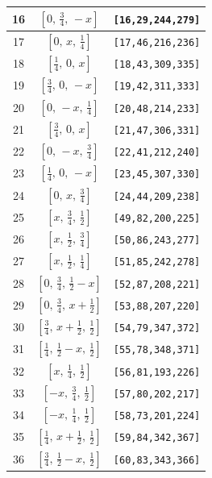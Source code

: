 \documentclass[fleqn,8pt]{jsarticle}
\begin{document}
\begin{longtable}{ccc}
16 & $\left[ 0,\, \frac{3}{4},\, - x \right]$ & {\tt [16,29,244,279]} \\ \hline
17 & $\left[ 0,\, x,\, \frac{1}{4} \right]$ & {\tt [17,46,216,236]} \\ \hline
18 & $\left[ \frac{1}{4},\, 0,\, x \right]$ & {\tt [18,43,309,335]} \\ \hline
19 & $\left[ \frac{3}{4},\, 0,\, - x \right]$ & {\tt [19,42,311,333]} \\ \hline
20 & $\left[ 0,\, - x,\, \frac{1}{4} \right]$ & {\tt [20,48,214,233]} \\ \hline
21 & $\left[ \frac{3}{4},\, 0,\, x \right]$ & {\tt [21,47,306,331]} \\ \hline
22 & $\left[ 0,\, - x,\, \frac{3}{4} \right]$ & {\tt [22,41,212,240]} \\ \hline
23 & $\left[ \frac{1}{4},\, 0,\, - x \right]$ & {\tt [23,45,307,330]} \\ \hline
24 & $\left[ 0,\, x,\, \frac{3}{4} \right]$ & {\tt [24,44,209,238]} \\ \hline
25 & $\left[ x,\, \frac{3}{4},\, \frac{1}{2} \right]$ & {\tt [49,82,200,225]} \\ \hline
26 & $\left[ x,\, \frac{1}{2},\, \frac{3}{4} \right]$ & {\tt [50,86,243,277]} \\ \hline
27 & $\left[ x,\, \frac{1}{2},\, \frac{1}{4} \right]$ & {\tt [51,85,242,278]} \\ \hline
28 & $\left[ 0,\, \frac{3}{4},\, \frac{1}{2} - x \right]$ & {\tt [52,87,208,221]} \\ \hline
29 & $\left[ 0,\, \frac{3}{4},\, x + \frac{1}{2} \right]$ & {\tt [53,88,207,220]} \\ \hline
30 & $\left[ \frac{3}{4},\, x + \frac{1}{2},\, \frac{1}{2} \right]$ & {\tt [54,79,347,372]} \\ \hline
31 & $\left[ \frac{1}{4},\, \frac{1}{2} - x,\, \frac{1}{2} \right]$ & {\tt [55,78,348,371]} \\ \hline
32 & $\left[ x,\, \frac{1}{4},\, \frac{1}{2} \right]$ & {\tt [56,81,193,226]} \\ \hline
33 & $\left[ - x,\, \frac{3}{4},\, \frac{1}{2} \right]$ & {\tt [57,80,202,217]} \\ \hline
34 & $\left[ - x,\, \frac{1}{4},\, \frac{1}{2} \right]$ & {\tt [58,73,201,224]} \\ \hline
35 & $\left[ \frac{1}{4},\, x + \frac{1}{2},\, \frac{1}{2} \right]$ & {\tt [59,84,342,367]} \\ \hline
36 & $\left[ \frac{3}{4},\, \frac{1}{2} - x,\, \frac{1}{2} \right]$ & {\tt [60,83,343,366]} \\ \hline

\end{longtable}
\end{document}
